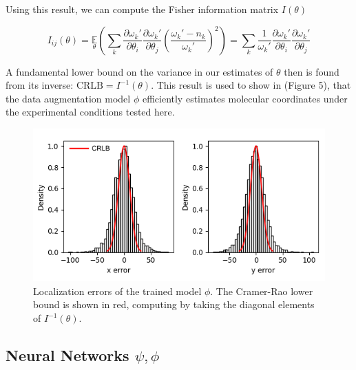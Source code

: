 \documentclass{article}
\begin{document}
Using this result, we can compute the Fisher information matrix $I(\theta)$

\begin{equation*}
I_{ij}(\theta) = \underset{\theta}{\mathbb{E}}\left(\sum_{k}\frac{\partial \omega_{k}'}{\partial\theta_{i}}\frac{\partial \omega_{k}'}{\partial\theta_{j}} \left(\frac{\omega_{k}'-n_{k}}{\omega_{k}'}\right)^{2}\right) = \sum_{k}\frac{1}{\omega_{k}'}\frac{\partial \omega_{k}'}{\partial\theta_{i}}\frac{\partial \omega_{k}'}{\partial\theta_{j}}
\end{equation*}

A fundamental lower bound on the variance in our estimates of $\theta$ then is found from its inverse: $\mathrm{CRLB} = I^{-1}(\theta)$. This result is used to show in (Figure 5), that the data augmentation model $\phi$ efficiently estimates molecular coordinates under the experimental conditions tested here. 

\begin{figure}
\centering
\includegraphics[scale=0.7]{media/Errors.png}
\caption{Localization errors of the trained model $\phi$. The Cramer-Rao lower bound is shown in red, computing by taking the diagonal elements of $I^{-1}(\theta)$.}
\end{figure}


\subsection{Neural Networks $\psi,\phi$}
\end{document}
